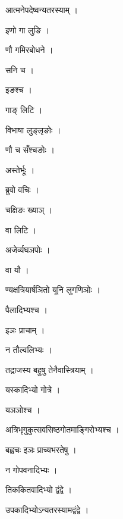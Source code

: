 \documentclass[10pt, openany]{book}
\begin{document}
\noindent आत्मनेपदेष्वन्यतरस्याम् ।

\noindent इणो गा लुङि ।

\noindent णौ गमिरबोधने ।

\noindent सनि च ।

\noindent इङश्च ।

\noindent गाङ् लिटि ।

\noindent विभाषा लुङ्लृङोः ।

\noindent णौ च सँश्चङोः ।

\noindent अस्तेर्भूः ।

\noindent ब्रुवो वचिः ।

\noindent चक्षिङः ख्याञ् ।

\noindent वा लिटि ।

\noindent अजेर्व्यघञपोः ।

\noindent वा यौ ।

\noindent ण्यक्षत्रियार्षञितो यूनि लुगणिञोः ।

\noindent पैलादिभ्यश्च ।

\noindent इञः प्राचाम् ।

\noindent न तौल्वलिभ्यः ।

\noindent तद्राजस्य बहुषु तेनैवास्त्रियाम् ।

\noindent यस्कादिभ्यो गोत्रे ।

\noindent यञञोश्च ।

\noindent अत्रिभृगुकुत्सवसिष्ठगोतमाङ्गिरोभ्यश्च ।

\noindent बह्वचः इञः प्राच्यभरतेषु ।

\noindent न गोपवनादिभ्यः ।

\noindent तिककितवादिभ्यो द्वंद्वे ।

\noindent उपकादिभ्योऽन्यतरस्यामद्वंद्वे ।
\end{document}
